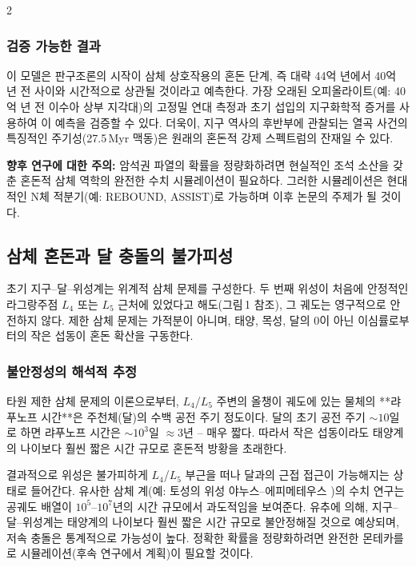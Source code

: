 \documentclass[12pt,a4paper]{article}
\begin{document}
\begin{multicols}{2}
		\subsubsection{검증 가능한 결과}
		이 모델은 판구조론의 시작이 삼체 상호작용의 혼돈 단계, 즉 대략 44억 년에서 40억 년 전 사이와 시간적으로 상관될 것이라고 예측한다. 가장 오래된 오피올라이트(예: 40억 년 전 이수아 상부 지각대)의 고정밀 연대 측정과 초기 섭입의 지구화학적 증거를 사용하여 이 예측을 검증할 수 있다. 더욱이, 지구 역사의 후반부에 관찰되는 열곡 사건의 특징적인 주기성(27.5 Myr 맥동)은 원래의 혼돈적 강제 스펙트럼의 잔재일 수 있다.
		
		\vspace{0.2cm}
		\noindent
		\textbf{향후 연구에 대한 주의:} 암석권 파열의 확률을 정량화하려면 현실적인 조석 소산을 갖춘 혼돈적 삼체 역학의 완전한 수치 시뮬레이션이 필요하다. 그러한 시뮬레이션은 현대적인 N체 적분기(예: REBOUND, ASSIST)로 가능하며 이후 논문의 주제가 될 것이다.
		
		\subsection{삼체 혼돈과 달 충돌의 불가피성}
		초기 지구–달–위성계는 위계적 삼체 문제를 구성한다. 두 번째 위성이 처음에 안정적인 라그랑주점 \(L_4\) 또는 \(L_5\) 근처에 있었다고 해도(그림 1 참조), 그 궤도는 영구적으로 안전하지 않다. 제한 삼체 문제는 가적분이 아니며, 태양, 목성, 달의 0이 아닌 이심률로부터의 작은 섭동이 혼돈 확산을 구동한다.
		
		\subsubsection{불안정성의 해석적 추정}
		타원 제한 삼체 문제의 이론으로부터, \(L_4\)/\(L_5\) 주변의 올챙이 궤도에 있는 물체의 **랴푸노프 시간**은 주천체(달)의 수백 공전 주기 정도이다. 달의 초기 공전 주기 \(\sim 10\)일로 하면 랴푸노프 시간은 \(\sim 10^{3}\)일 \(\approx 3\)년 – 매우 짧다. 따라서 작은 섭동이라도 태양계의 나이보다 훨씬 짧은 시간 규모로 혼돈적 방황을 초래한다.
		
		결과적으로 위성은 불가피하게 \(L_4\)/\(L_5\) 부근을 떠나 달과의 근접 접근이 가능해지는 상태로 들어간다. 유사한 삼체 계(예: 토성의 위성 야누스–에피메테우스 \cite{JanusEpimetheus})의 수치 연구는 공궤도 배열이 \(10^{5}\)–\(10^{7}\)년의 시간 규모에서 과도적임을 보여준다. 유추에 의해, 지구–달–위성계는 태양계의 나이보다 훨씬 짧은 시간 규모로 불안정해질 것으로 예상되며, 저속 충돌은 통계적으로 가능성이 높다. 정확한 확률을 정량화하려면 완전한 몬테카를로 시뮬레이션(후속 연구에서 계획)이 필요할 것이다.
		

\end{multicols}
\end{document}
